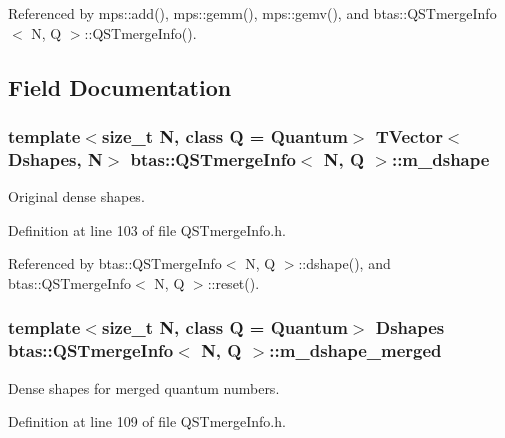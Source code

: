 Referenced by mps\-::add(), mps\-::gemm(), mps\-::gemv(), and btas\-::\-Q\-S\-Tmerge\-Info$<$ N, Q $>$\-::\-Q\-S\-Tmerge\-Info().



\subsection{Field Documentation}
\subsubsection[{m\-\_\-dshape}]{\setlength{\rightskip}{0pt plus 5cm}template$<$size\-\_\-t N, class Q = Quantum$>$ {\bf T\-Vector}$<${\bf Dshapes}, N$>$ {\bf btas\-::\-Q\-S\-Tmerge\-Info}$<$ N, Q $>$\-::m\-\_\-dshape\hspace{0.3cm}{\ttfamily [private]}}\label{d0/de7/classbtas_1_1QSTmergeInfo_a9f4c81ec121f96c84297da7af1ae80f2}


Original dense shapes. 



Definition at line 103 of file Q\-S\-Tmerge\-Info.\-h.



Referenced by btas\-::\-Q\-S\-Tmerge\-Info$<$ N, Q $>$\-::dshape(), and btas\-::\-Q\-S\-Tmerge\-Info$<$ N, Q $>$\-::reset().

\subsubsection[{m\-\_\-dshape\-\_\-merged}]{\setlength{\rightskip}{0pt plus 5cm}template$<$size\-\_\-t N, class Q = Quantum$>$ {\bf Dshapes} {\bf btas\-::\-Q\-S\-Tmerge\-Info}$<$ N, Q $>$\-::m\-\_\-dshape\-\_\-merged\hspace{0.3cm}{\ttfamily [private]}}\label{d0/de7/classbtas_1_1QSTmergeInfo_a41d6d644bc6c77913c7db42e602f5a3d}


Dense shapes for merged quantum numbers. 



Definition at line 109 of file Q\-S\-Tmerge\-Info.\-h.



